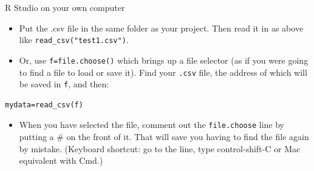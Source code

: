 \documentclass[
  ignorenonframetext,
]{beamer}
\providecommand{\tightlist}{%
  \setlength{\itemsep}{0pt}\setlength{\parskip}{0pt}}
\begin{document}
\begin{frame}[fragile]{R Studio on your own computer}
\protect\hypertarget{r-studio-on-your-own-computer}{}

\begin{itemize}
\tightlist
\item
  Put the .csv file in the same folder as your project. Then read it in
  as above like \texttt{read\_csv("test1.csv")}.
\item
  Or, use \texttt{f=file.choose()} which brings up a file selector (as
  if you were going to find a file to load or save it). Find your
  \texttt{.csv} file, the address of which will be saved in \texttt{f},
  and then:
\end{itemize}

\begin{verbatim}
mydata=read_csv(f)
\end{verbatim}

\begin{itemize}
\tightlist
\item
  When you have selected the file, comment out the \texttt{file.choose}
  line by putting a \# on the front of it. That will save you having to
  find the file again by mistake. (Keyboard shortcut: go to the line,
  type control-shift-C or Mac equivalent with Cmd.)
\end{itemize}

\end{frame}
\end{document}
